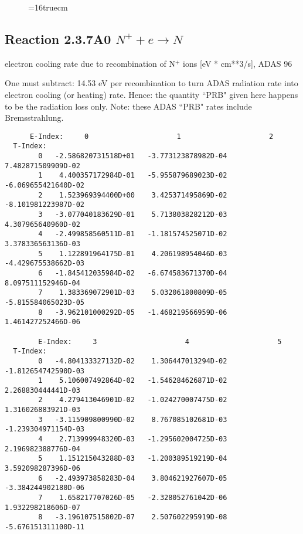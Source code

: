 \documentclass[12pt,dvipdfmx]{article}
\begin{document}
{\begin{small}
\begin{verbatim}
\end{verbatim}\end{small}
\begin{figure} \label{2.3.6rl}
\epsfxsize=16truecm
\end{figure}


\subsection{
  Reaction 2.3.7A0  $N^+ + e \rightarrow N   $
}
electron cooling rate due to recombination of N$^+$ ions [eV *
cm**3/s], ADAS 96

One must subtract: 14.53 eV per recombination to turn ADAS radiation
rate into electron cooling (or heating) rate. Hence: the quantity
``PRB" given here happens to be the radiation loss only. Note: these
ADAS ``PRB" rates include Bremsstrahlung.

\begin{small}\begin{verbatim}
      E-Index:     0                     1                     2
  T-Index:
        0   -2.586820731518D+01   -3.773123878982D-04    7.482871509909D-02
        1    4.400357172984D-01   -5.955879689023D-02   -6.069655421640D-02
        2    1.523969394400D+00    3.425371495869D-02   -8.101981223987D-02
        3   -3.077040183629D-01    5.713803828212D-03    4.307965640960D-02
        4   -2.499858560511D-01   -1.181574525071D-02    3.378336563136D-03
        5    1.122891964175D-01    4.206198954046D-03   -4.429675538662D-03
        6   -1.845412035984D-02   -6.674583671370D-04    8.097511152946D-04
        7    1.383369072901D-03    5.032061800809D-05   -5.815584065023D-05
        8   -3.962101000292D-05   -1.468219566959D-06    1.461427252466D-06

        E-Index:     3                     4                     5
  T-Index:
        0   -4.804133327132D-02    1.306447013294D-02   -1.812654742590D-03
        1    5.106007492864D-02   -1.546284626871D-02    2.268830444441D-03
        2    4.279413046901D-02   -1.024270007475D-02    1.316026883921D-03
        3   -3.115909800990D-02    8.767085102681D-03   -1.239304971154D-03
        4    2.713999948320D-03   -1.295602004725D-03    2.196982388776D-04
        5    1.151215043288D-03   -1.200389519219D-04    3.592098287396D-06
        6   -2.493973858283D-04    3.804621927607D-05   -3.384244902180D-06
        7    1.658217707026D-05   -2.328052761042D-06    1.932298218606D-07
        8   -3.196107515802D-07    2.507602295919D-08   -5.676151311100D-11


\end{verbatim}
\end{small}}
\end{document}
